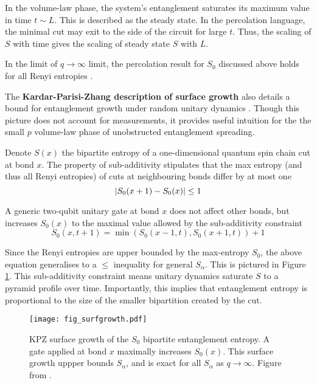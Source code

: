 \documentclass[10pt]{article}
\begin{document}
In the volume-law phase, the system's entanglement saturates its maximum value in time $t \sim L$. This is described as the steady state. In the percolation language, the minimal cut may exit to the side of the circuit for large $t$. Thus, the scaling of $S$ with time gives the scaling of steady state $S$ with $L$. 

In the limit of $q \rightarrow \infty$ limit, the percolation result for $S_0$ discussed above holds for all Renyi entropies \cite{nahum2017quantum}. 




The \textbf{Kardar-Parisi-Zhang description of surface growth} also details a bound for entanglement growth under random unitary dynamics \cite{nahum2017quantum}. Though this picture does not account for measurements, it provides useful intuition for the the small $p$ volume-law phase of unobstructed entanglement spreading. 

Denote $S(x)$ the bipartite entropy of a one-dimensional quantum spin chain cut at bond $x$. The property of sub-additivity stipulates that the max entropy (and thus all Renyi entropies) of cuts at neighbouring bonds differ by at most one
\begin{equation}
\abs{S_0(x+1) - S_0(x)} \leq 1
\end{equation}

A generic two-qubit unitary gate at bond $x$ does not affect other bonds, but increases $S_0(x)$ to the maximal value allowed by the sub-additivity constraint
\begin{equation}
S_0(x,t+1) = \min\left(S_0(x-1,t), S_0(x+1,t)\right) + 1
\end{equation}

Since the Renyi entropies are upper bounded by the max-entropy $S_0$, the above equation generalises to a $\leq$ inequality for general $S_\alpha$. This is pictured in Figure \ref{fig_surfgrowth}. This sub-additivity constraint means unitary dynamics saturate $S$ to a pyramid profile over time. Importantly, this implies that entanglement entropy is proportional to the size of the smaller bipartition created by the cut.

\begin{figure}[h]
\centering
\texttt{[image: fig\_surfgrowth.pdf]}
\caption{KPZ surface growth of the $S_0$ bipartite entanglement entropy. A gate applied at bond $x$ maximally increases $S_0(x)$. This surface growth uppper bounds $S_\alpha$, and is exact for all $S_\alpha$ as $q\rightarrow\infty$. Figure from \cite{nahum2017quantum}.}
\label{fig_surfgrowth}
\end{figure}
\end{document}
